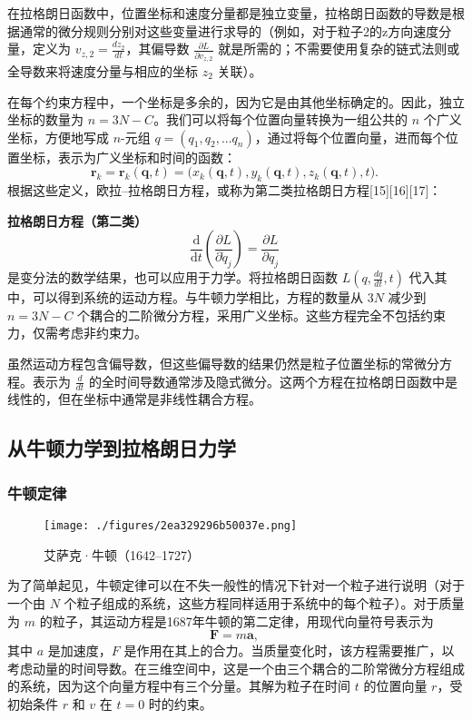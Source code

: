 在拉格朗日函数中，位置坐标和速度分量都是独立变量，拉格朗日函数的导数是根据通常的微分规则分别对这些变量进行求导的（例如，对于粒子2的z方向速度分量，定义为 \(v_{z,2} = \frac{dz_2}{dt}\)，其偏导数 \(\frac{\partial L}{\partial v_{z,2}}\) 就是所需的；不需要使用复杂的链式法则或全导数来将速度分量与相应的坐标 \(z_2\) 关联）。

在每个约束方程中，一个坐标是多余的，因为它是由其他坐标确定的。因此，独立坐标的数量为 \(n = 3N - C\)。我们可以将每个位置向量转换为一组公共的 \(n\) 个广义坐标，方便地写成 \(n\)-元组 \(q = (q_1, q_2, ... q_n)\)，通过将每个位置向量，进而每个位置坐标，表示为广义坐标和时间的函数：
\[
\mathbf{r}_{k} = \mathbf{r}_{k}(\mathbf{q}, t) = {\big (}x_{k}(\mathbf{q}, t), y_{k}(\mathbf{q}, t), z_{k}(\mathbf{q}, t), t{\big )}.~
\]
根据这些定义，欧拉–拉格朗日方程，或称为第二类拉格朗日方程[15][16][17]：

\textbf{拉格朗日方程（第二类）}
\[
\frac{\mathrm{d}}{\mathrm{d}t}\left(\frac{\partial L}{\partial \dot{q}_j}\right) = \frac{\partial L}{\partial q_j}~
\]
是变分法的数学结果，也可以应用于力学。将拉格朗日函数 \(L(q, \frac{dq}{dt}, t)\) 代入其中，可以得到系统的运动方程。与牛顿力学相比，方程的数量从 \(3N\) 减少到 \(n = 3N - C\) 个耦合的二阶微分方程，采用广义坐标。这些方程完全不包括约束力，仅需考虑非约束力。

虽然运动方程包含偏导数，但这些偏导数的结果仍然是粒子位置坐标的常微分方程。表示为 \(\frac{d}{dt}\) 的全时间导数通常涉及隐式微分。这两个方程在拉格朗日函数中是线性的，但在坐标中通常是非线性耦合方程。
\subsection{从牛顿力学到拉格朗日力学}  
\subsubsection{牛顿定律}
\begin{figure}[ht]
\centering
\texttt{[image: ./figures/2ea329296b50037e.png]}
\caption{艾萨克·牛顿（1642–1727）} \label{fig_LGL_4}
\end{figure}
为了简单起见，牛顿定律可以在不失一般性的情况下针对一个粒子进行说明（对于一个由 \(N\) 个粒子组成的系统，这些方程同样适用于系统中的每个粒子）。对于质量为 \(m\) 的粒子，其运动方程是1687年牛顿的第二定律，用现代向量符号表示为
\[
\mathbf{F} = m \mathbf{a},~
\]
其中 \(a\) 是加速度，\(F\) 是作用在其上的合力。当质量变化时，该方程需要推广，以考虑动量的时间导数。在三维空间中，这是一个由三个耦合的二阶常微分方程组成的系统，因为这个向量方程中有三个分量。其解为粒子在时间 \(t\) 的位置向量 \(r\)，受初始条件 \(r\) 和 \(v\) 在 \(t = 0\) 时的约束。

